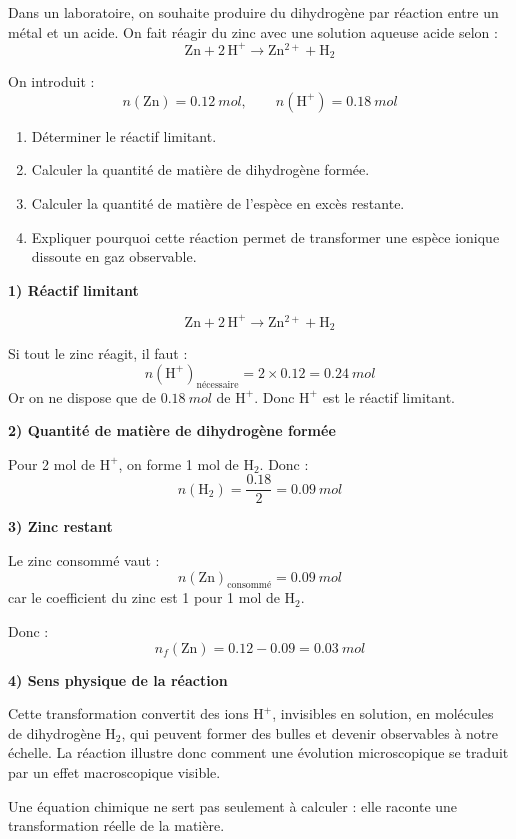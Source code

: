 \documentclass[11pt,a4paper]{article}
\newcommand{\Rlim}{réactif limitant}
\newcommand{\Hplus}{\mathrm{H^+}}
\newcommand{\Hdeux}{\mathrm{H_2}}
\begin{document}
\begin{enoncebox}
Dans un laboratoire, on souhaite produire du dihydrogène par réaction entre un métal et un acide.  
On fait réagir du zinc avec une solution aqueuse acide selon :
\[
\mathrm{Zn} + 2\,\mathrm{H^+} \rightarrow \mathrm{Zn^{2+}} + \mathrm{H_2}
\]

On introduit :
\[
n(\mathrm{Zn}) = \SI{0.12}{mol},\qquad n(\mathrm{H^+}) = \SI{0.18}{mol}
\]

\begin{enumerate}[label=\arabic*)]
    \item Déterminer le réactif limitant.
    \item Calculer la quantité de matière de dihydrogène formée.
    \item Calculer la quantité de matière de l'espèce en excès restante.
    \item Expliquer pourquoi cette réaction permet de transformer une espèce ionique dissoute en gaz observable.
\end{enumerate}
\end{enoncebox}

\begin{corrigebox}
\textbf{1) Réactif limitant}

\[
\mathrm{Zn} + 2\,\mathrm{H^+} \rightarrow \mathrm{Zn^{2+}} + \mathrm{H_2}
\]

Si tout le zinc réagit, il faut :
\[
n(\Hplus)_{\text{nécessaire}} = 2\times 0.12 = \SI{0.24}{mol}
\]
Or on ne dispose que de \(\SI{0.18}{mol}\) de \(\Hplus\).  
Donc \(\Hplus\) est le \Rlim.

\textbf{2) Quantité de matière de dihydrogène formée}

Pour 2 mol de \(\Hplus\), on forme 1 mol de \(\Hdeux\).  
Donc :
\[
n(\Hdeux) = \frac{0.18}{2} = \SI{0.09}{mol}
\]

\textbf{3) Zinc restant}

Le zinc consommé vaut :
\[
n(\mathrm{Zn})_{\text{consommé}} = \SI{0.09}{mol}
\]
car le coefficient du zinc est 1 pour 1 mol de \(\Hdeux\).

Donc :
\[
n_f(\mathrm{Zn}) = 0.12 - 0.09 = \SI{0.03}{mol}
\]

\textbf{4) Sens physique de la réaction}

Cette transformation convertit des ions \(\Hplus\), invisibles en solution, en molécules de dihydrogène \(\Hdeux\), qui peuvent former des bulles et devenir observables à notre échelle.  
La réaction illustre donc comment une évolution microscopique se traduit par un effet macroscopique visible.

\begin{bilanbox}
Une équation chimique ne sert pas seulement à calculer : elle raconte une transformation réelle de la matière.
\end{bilanbox}
\end{corrigebox}
\end{document}
